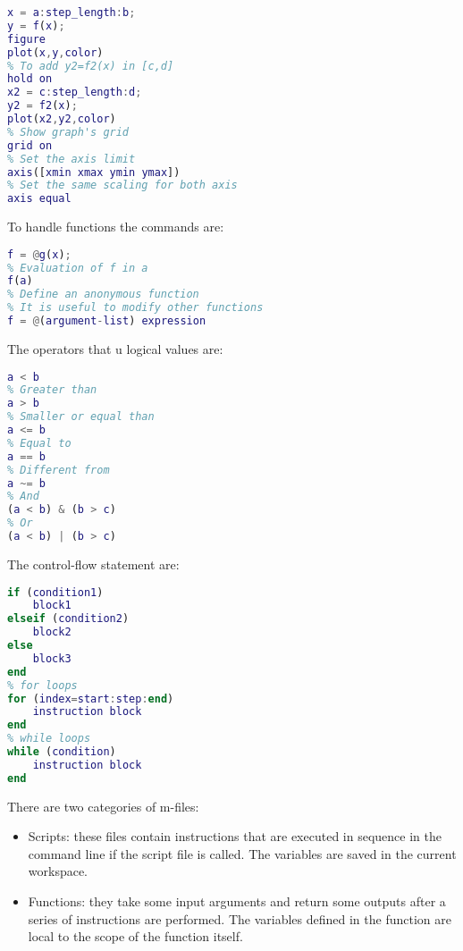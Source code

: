 \documentclass[12pt, a4paper]{report}
\newtheorem[style=M,bodystyle=\normalfont]{theorem}{Theorem}
\newtheorem[style=M,bodystyle=\normalfont]{corollary}{Corollary}
\newtheorem[style=M,bodystyle=\normalfont]{lemma}{Lemma}
\newtheorem[style=M,bodystyle=\normalfont]{definition}{Definition}
\begin{document}
    \begin{lstlisting}[language=Matlab]
% To plot y=f(x) in [a,b]
x = a:step_length:b;
y = f(x);   
figure         
plot(x,y,color)
% To add y2=f2(x) in [c,d]
hold on 
x2 = c:step_length:d;
y2 = f2(x);
plot(x2,y2,color)     
% Show graph's grid
grid on 
% Set the axis limit
axis([xmin xmax ymin ymax]) 
% Set the same scaling for both axis
axis equal 
    \end{lstlisting} 
    To handle functions the commands are: 
    \begin{lstlisting}[language=Matlab]
% Define a function handle to g(x)
f = @g(x);
% Evaluation of f in a
f(a) 
% Define an anonymous function
% It is useful to modify other functions
f = @(argument-list) expression
    \end{lstlisting} 
    The operators that u logical values are:  
    \begin{lstlisting}[language=Matlab]
% Smaller than
a < b     
% Greater than
a > b
% Smaller or equal than
a <= b   
% Equal to
a == b    
% Different from
a ~= b  
% And
(a < b) & (b > c)  
% Or   
(a < b) | (b > c)     
    \end{lstlisting} 
    The control-flow statement are: 
    \begin{lstlisting}[language=Matlab]
% if-then-else statements
if (condition1)
    block1
elseif (condition2)
    block2
else
    block3
end
% for loops
for (index=start:step:end)
    instruction block
end
% while loops
while (condition)
    instruction block
end
    \end{lstlisting}    
    There are two categories of m-files: 
    \begin{itemize}
        \item Scripts: these files contain instructions that are executed in sequence in the command line if the script file is called. 
            The variables are saved in the current workspace.
        \item Functions: they take some input arguments and return some outputs after a series of instructions are performed. 
            The variables defined in the function are local to the scope of the function itself.
    \end{itemize}

\newpage
\end{document}
